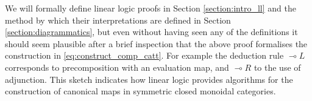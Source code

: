 \documentclass[english,letter paper,12pt,reqno]{article}
\theoremstyle{example}
\numberwithin{equation}{section}
\def\Hom{\operatorname{Hom}}
\begin{document}
We will formally define linear logic proofs in Section \ref{section:intro_ll} and the method by which their interpretations are defined in Section \ref{section:diagrammatics}, but even without having seen any of the definitions it should seem plausible after a brief inspection that the above proof formalises the construction in \eqref{eq:construct_comp_catt}. For example the deduction rule $\multimap L$ corresponds to precomposition with an evaluation map, and $\multimap R$ to the use of adjunction. This sketch indicates how linear logic provides algorithms for the construction of canonical maps in symmetric closed monoidal categories. %
\\



\end{document}
